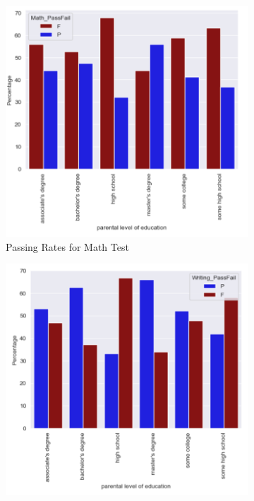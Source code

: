 \documentclass[man,floatsintext]{apa6} %
\begin{document}
\begin{figure}[H]
    \centering
    \caption{Correlations of Parent Education to Student Pass Rates}
    \begin{subfigure}[b]{0.28\textwidth}
    \includegraphics[width=\linewidth]{MathPFBarGraph.png}
    \caption{Passing Rates for Math Test}
    \label{fig:math}
    \end{subfigure}
    \begin{subfigure}[b]{0.28\textwidth}
    \includegraphics[width=\linewidth]{WritingPFBarGraph.png}

\end{subfigure}
\end{figure}
\end{document}
